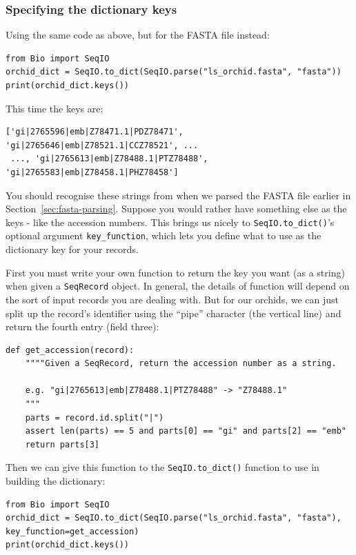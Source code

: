 \documentclass{report}
\begin{document}
\subsubsection{Specifying the dictionary keys}
\label{seq:seqio-todict-functionkey}

Using the same code as above, but for the FASTA file instead:

\begin{verbatim}
from Bio import SeqIO
orchid_dict = SeqIO.to_dict(SeqIO.parse("ls_orchid.fasta", "fasta"))
print(orchid_dict.keys())
\end{verbatim}

\noindent This time the keys are:

\begin{verbatim}
['gi|2765596|emb|Z78471.1|PDZ78471', 'gi|2765646|emb|Z78521.1|CCZ78521', ...
 ..., 'gi|2765613|emb|Z78488.1|PTZ78488', 'gi|2765583|emb|Z78458.1|PHZ78458']
\end{verbatim}

You should recognise these strings from when we parsed the FASTA file earlier in Section~\ref{sec:fasta-parsing}.  Suppose you would rather have something else as the keys - like the accession numbers.  This brings us nicely to \verb|SeqIO.to_dict()|'s optional argument \verb|key_function|, which lets you define what to use as the dictionary key for your records.

First you must write your own function to return the key you want (as a string) when given a \verb|SeqRecord| object.  In general, the details of function will depend on the sort of input records you are dealing with.  But for our orchids, we can just split up the record's identifier using the ``pipe'' character (the vertical line) and return the fourth entry (field three):

\begin{verbatim}
def get_accession(record):
    """"Given a SeqRecord, return the accession number as a string.
  
    e.g. "gi|2765613|emb|Z78488.1|PTZ78488" -> "Z78488.1"
    """
    parts = record.id.split("|")
    assert len(parts) == 5 and parts[0] == "gi" and parts[2] == "emb"
    return parts[3]
\end{verbatim}

\noindent Then we can give this function to the \verb|SeqIO.to_dict()| function to use in building the dictionary:

\begin{verbatim}
from Bio import SeqIO
orchid_dict = SeqIO.to_dict(SeqIO.parse("ls_orchid.fasta", "fasta"), key_function=get_accession)
print(orchid_dict.keys())
\end{verbatim}
\end{document}
